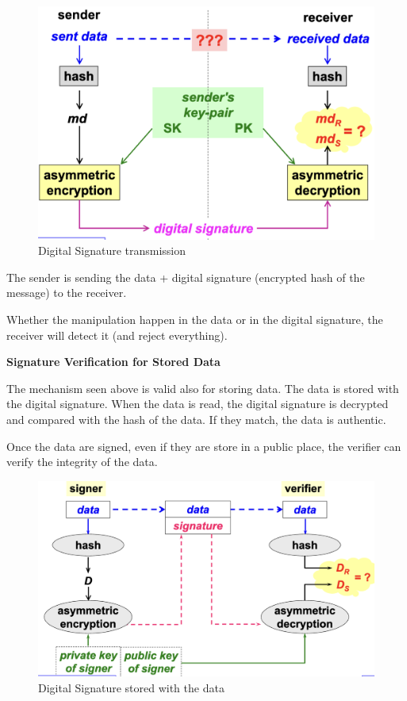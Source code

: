\begin{figure}[H]
    \centering
    \includegraphics[width=0.6\linewidth]{Images/Cryptography/ds.png}
    \caption{Digital Signature transmission}
\end{figure}
\begin{tcolorbox}[colback=red!10!white, colframe=red!70!black, coltitle=white, title=For the Exam]
    The sender is sending the data + digital signature (encrypted hash of the message) to the receiver. 
    
    \vspace{0.2cm}
    
    Whether the manipulation happen in the data or in the digital signature, the receiver will detect it (and reject everything).
\end{tcolorbox}


\begin{center}
    \textbf{Signature Verification for Stored Data}
\end{center}

The mechanism seen above is valid also for storing data. The data is stored with the digital signature. When the data is read, the digital signature is decrypted and compared with the hash of the data. If they match, the data is authentic.
\begin{tcolorbox}[colback=blue!10!white, colframe=blue!50!white]
Once the data are signed, even if they are store in a public place, the verifier can verify the integrity of the data.
\end{tcolorbox}

\begin{figure}[H]
    \centering
    \includegraphics[width=0.6\linewidth]{Images/Cryptography/ds_storing.png}
    \caption{Digital Signature stored with the data}
\end{figure}

